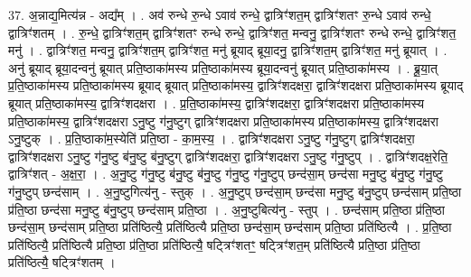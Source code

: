 \documentclass[17pt]{extarticle}
\begin{document}
37. अ॒न्नाद्य॒मित्य॑न्न - अद्य᳚म् । . अव॑ रुन्धे रु॒न्धे ऽवाव॑ रुन्धे॒ द्वात्रिꣳ॑शत॒म् द्वात्रिꣳ॑शतꣳ रु॒न्धे ऽवाव॑ रुन्धे॒ द्वात्रिꣳ॑शतम् । . रु॒न्धे॒ द्वात्रिꣳ॑शत॒म् द्वात्रिꣳ॑शतꣳ रुन्धे रुन्धे॒ द्वात्रिꣳ॑शत॒ मन्वनु॒ द्वात्रिꣳ॑शतꣳ रुन्धे रुन्धे॒ द्वात्रिꣳ॑शत॒ मनु॑ । . द्वात्रिꣳ॑शत॒ मन्वनु॒ द्वात्रिꣳ॑शत॒म् द्वात्रिꣳ॑शत॒ मनु॑ ब्रूयाद् ब्रूया॒दनु॒ द्वात्रिꣳ॑शत॒म् द्वात्रिꣳ॑शत॒ मनु॑ ब्रूयात् । . अनु॑ ब्रूयाद् ब्रूया॒दन्वनु॑ ब्रूयात् प्रति॒ष्ठाका॑मस्य प्रति॒ष्ठाका॑मस्य ब्रूया॒दन्वनु॑ ब्रूयात् प्रति॒ष्ठाका॑मस्य । . ब्रू॒या॒त् प्र॒ति॒ष्ठाका॑मस्य प्रति॒ष्ठाका॑मस्य ब्रूयाद् ब्रूयात् प्रति॒ष्ठाका॑मस्य॒ द्वात्रिꣳ॑शदक्षरा॒ द्वात्रिꣳ॑शदक्षरा प्रति॒ष्ठाका॑मस्य ब्रूयाद् ब्रूयात् प्रति॒ष्ठाका॑मस्य॒ द्वात्रिꣳ॑शदक्षरा । . प्र॒ति॒ष्ठाका॑मस्य॒ द्वात्रिꣳ॑शदक्षरा॒ द्वात्रिꣳ॑शदक्षरा प्रति॒ष्ठाका॑मस्य प्रति॒ष्ठाका॑मस्य॒ द्वात्रिꣳ॑शदक्षरा ऽनु॒ष्टु ग॑नु॒ष्टुग् द्वात्रिꣳ॑शदक्षरा प्रति॒ष्ठाका॑मस्य प्रति॒ष्ठाका॑मस्य॒ द्वात्रिꣳ॑शदक्षरा ऽनु॒ष्टुक् । . प्र॒ति॒ष्ठाका॑म॒स्येति॑ प्रति॒ष्ठा - का॒म॒स्य॒ । . द्वात्रिꣳ॑शदक्षरा ऽनु॒ष्टु ग॑नु॒ष्टुग् द्वात्रिꣳ॑शदक्षरा॒ द्वात्रिꣳ॑शदक्षरा ऽनु॒ष्टु ग॑नु॒ष्टु ब॑नु॒ष्टु ब॑नु॒ष्टुग् द्वात्रिꣳ॑शदक्षरा॒ द्वात्रिꣳ॑शदक्षरा ऽनु॒ष्टु ग॑नु॒ष्टुप् । . द्वात्रिꣳ॑शदक्ष॒रेति॒ द्वात्रिꣳ॑शत् - अ॒क्ष॒रा॒ । . अ॒नु॒ष्टु ग॑नु॒ष्टु ब॑नु॒ष्टु ब॑नु॒ष्टु ग॑नु॒ष्टु ग॑नु॒ष्टुप् छन्द॑सा॒म् छन्द॑सा मनु॒ष्टु ब॑नु॒ष्टु ग॑नु॒ष्टु ग॑नु॒ष्टुप् छन्द॑साम् । . अ॒नु॒ष्टुगित्य॑नु - स्तुक् । . अ॒नु॒ष्टुप् छन्द॑सा॒म् छन्द॑सा मनु॒ष्टु ब॑नु॒ष्टुप् छन्द॑साम् प्रति॒ष्ठा प्र॑ति॒ष्ठा छन्द॑सा मनु॒ष्टु ब॑नु॒ष्टुप् छन्द॑साम् प्रति॒ष्ठा । . अ॒नु॒ष्टुबित्य॑नु - स्तुप् । . छन्द॑साम् प्रति॒ष्ठा प्र॑ति॒ष्ठा छन्द॑सा॒म् छन्द॑साम् प्रति॒ष्ठा प्रति॑ष्ठित्यै॒ प्रति॑ष्ठित्यै प्रति॒ष्ठा छन्द॑सा॒म् छन्द॑साम् प्रति॒ष्ठा प्रति॑ष्ठित्यै । . प्र॒ति॒ष्ठा प्रति॑ष्ठित्यै॒ प्रति॑ष्ठित्यै प्रति॒ष्ठा प्र॑ति॒ष्ठा प्रति॑ष्ठित्यै॒ षट्त्रिꣳ॑शतꣳ॒॒ षट्त्रिꣳ॑शत॒म् प्रति॑ष्ठित्यै प्रति॒ष्ठा प्र॑ति॒ष्ठा प्रति॑ष्ठित्यै॒ षट्त्रिꣳ॑शतम् । \newline
\end{document}
